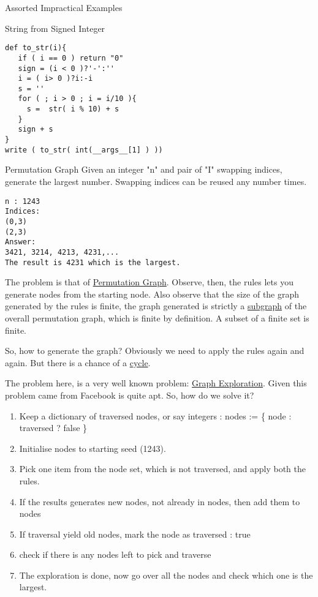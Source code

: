 \begin{section}{Assorted Impractical Examples}
\begin{subsection}{String from Signed Integer}
\begin{center}\begin{minipage}{\linewidth}
\begin{lstlisting}[style=JexlStyle]
def to_str(i){
   if ( i == 0 ) return "0"
   sign = (i < 0 )?'-':''
   i = ( i> 0 )?i:-i
   s = '' 
   for ( ; i > 0 ; i = i/10 ){
     s =  str( i % 10) + s 
   } 
   sign + s    
}
write ( to_str( int(__args__[1] ) ))
\end{lstlisting}  
\end{minipage}\end{center}
\end{subsection}

\begin{subsection}{Permutation Graph}
Given an integer "n" and pair of "I" swapping indices, 
generate the largest number. Swapping indices can be reused any number times. 

\begin{lstlisting}[style=all]
n : 1243 
Indices: 
(0,3) 
(2,3) 
Answer: 
3421, 3214, 4213, 4231,...
The result is 4231 which is the largest.
\end{lstlisting}  

The problem is that of \href{https://en.wikipedia.org/wiki/Permutation\_graph}{Permutation Graph}.
Observe, then, the rules lets you generate nodes from the starting node.
Also observe that the size of the graph generated by the rules is finite, 
the graph generated is strictly a 
\href{https://en.wikipedia.org/wiki/Glossary_of_graph_theory\#subgraph}{subgraph} 
of the overall permutation graph, 
which is finite by definition. A subset of a finite set is finite. 

So, how to generate the graph? Obviously we need to apply the rules again and again.
But there is a chance of a \href{https://en.wikipedia.org/wiki/Cycle\_(graph_theory)}{cycle}.

The problem here, is a very well known problem: 
\href{https://en.wikipedia.org/wiki/Graph\_traversal\#Graph\_exploration}{Graph Exploration}.
Given this problem came from Facebook is quite apt. So, how do we solve it?

\begin{enumerate}
\item{Keep a dictionary of traversed nodes, or say integers : nodes := \{ node : traversed ? false \}  }
\item{Initialise nodes to starting seed (1243). }
\item{Pick one item from the node set, which is not traversed, and apply both the rules. }
\item{If the results generates new nodes, not already in nodes, then add them to nodes }
\item{If traversal yield old nodes, mark the node as traversed : true }
\item{check if there is any nodes left to pick and traverse}
\item{The exploration is done, now go over all the nodes and check which one is the largest. }
\end{enumerate}


\end{subsection}
\end{section}
